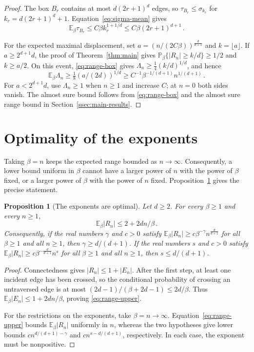 \documentclass[11pt]{amsart}
\theoremstyle{plain}
\newtheorem{proposition}[theorem]{Proposition}
\theoremstyle{definition}
\renewcommand{\P}{\mathbb P}
\newcommand{\E}{\mathbb E}
\begin{document}
	\begin{proof}
		The box $B_r$ contains at most $d(2r+1)^d$ edges, so
		$\tau_{B_r}\leq\sigma_{k_r}$ for $k_r=d(2r+1)^d+1$.
		Equation~\eqref{eq:sigma-mean} gives
		\[
		\E_\beta\tau_{B_r}\leq C\beta k_r^{1+1/d}
		\leq C\beta(2r+1)^{d+1}\, .
		\]

		For the expected maximal displacement, set
		$a=(n/(2C\beta))^{\frac{d}{d+1}}$ and $k=\lfloor a\rfloor$.
		If $a\geq2^{d+1}d$, the proof of Theorem~\ref{thm:main} gives
		$\P_\beta\{|R_n|\geq k/d\}\geq1/2$ and $k\geq a/2$.
		On this event, \eqref{eq:range-box} gives
		$\Lambda_n\geq\tfrac14(k/d)^{1/d}$, and hence
		\[
		\E_\beta\Lambda_n\geq\tfrac18(a/(2d))^{1/d}
		\geq C^{-1}\beta^{-1/(d+1)}n^{1/(d+1)}\, .
		\]
		For $a<2^{d+1}d$, use $\Lambda_n\geq1$ when $n\geq1$ and increase $C$;
		at $n=0$ both sides vanish.
		The almost sure bound follows from \eqref{eq:range-box} and the almost
		sure range bound in Section~\ref{ssec:main-results}.
	\end{proof}

	\section{Optimality of the exponents}\label{sec:sharp}

	Taking $\beta=n$ keeps the expected range bounded as $n\to\infty$.
	Consequently, a lower bound uniform in $\beta$ cannot have a larger power
	of $n$ with the power of $\beta$ fixed, or a larger power of $\beta$ with
	the power of $n$ fixed. Proposition~\ref{prop:beta-sharp} gives the precise
	statement.

	\begin{proposition}[The exponents are optimal]\label{prop:beta-sharp} Let
		$d\geq2$. For every $\beta\geq1$ and every $n\geq1$,
		\begin{equation}\label{eq:range-upper}
			\E_\beta|R_n|\leq2+2dn/\beta\, .
		\end{equation}
		Consequently, if the real numbers $\gamma$ and $c>0$ satisfy
		$\E_\beta|R_n|\geq c\beta^{-\gamma}n^{\frac{d}{d+1}}$ for all $\beta\geq1$ and all
		$n\geq1$, then $\gamma\geq d/(d+1)$. If the real numbers $s$ and $c>0$ satisfy
		$\E_\beta|R_n|\geq c\beta^{-\frac{d}{d+1}}n^{s}$ for all $\beta\geq1$ and all
		$n\geq1$, then $s\leq d/(d+1)$.
	\end{proposition}

	\begin{proof}
		Connectedness gives $|R_n|\leq1+|E_n|$.  After the first step, at least
		one incident edge has been crossed, so the conditional probability of
		crossing an untraversed edge is at most
		$(2d-1)/(\beta+2d-1)\leq2d/\beta$.
		Thus $\E_\beta|E_n|\leq1+2dn/\beta$, proving \eqref{eq:range-upper}.

		For the restrictions on the exponents, take $\beta=n\to\infty$.
		Equation~\eqref{eq:range-upper} bounds $\E_\beta|R_n|$ uniformly in $n$,
		whereas the two hypotheses give lower bounds
		$cn^{d/(d+1)-\gamma}$ and $cn^{s-d/(d+1)}$, respectively.
		In each case, the exponent must be nonpositive.
	\end{proof}
\end{document}
